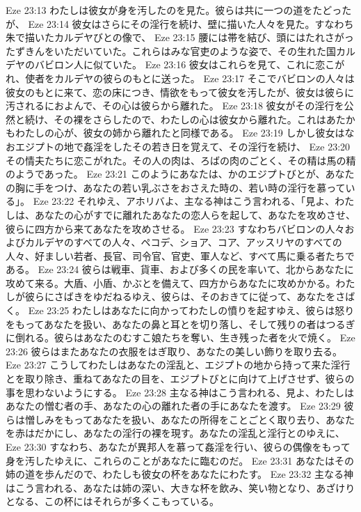 Eze 23:13  わたしは彼女が身を汚したのを見た。彼らは共に一つの道をたどったが、
Eze 23:14  彼女はさらにその淫行を続け、壁に描いた人々を見た。すなわち朱で描いたカルデヤびとの像で、
Eze 23:15  腰には帯を結び、頭にはたれさがったずきんをいただいていた。これらはみな官吏のような姿で、その生れた国カルデヤのバビロン人に似ていた。
Eze 23:16  彼女はこれらを見て、これに恋こがれ、使者をカルデヤの彼らのもとに送った。
Eze 23:17  そこでバビロンの人々は彼女のもとに来て、恋の床につき、情欲をもって彼女を汚したが、彼女は彼らに汚されるにおよんで、その心は彼らから離れた。
Eze 23:18  彼女がその淫行を公然と続け、その裸をさらしたので、わたしの心は彼女から離れた。これはあたかもわたしの心が、彼女の姉から離れたと同様である。
Eze 23:19  しかし彼女はなおエジプトの地で姦淫をしたその若き日を覚えて、その淫行を続け、
Eze 23:20  その情夫たちに恋こがれた。その人の肉は、ろばの肉のごとく、その精は馬の精のようであった。
Eze 23:21  このようにあなたは、かのエジプトびとが、あなたの胸に手をつけ、あなたの若い乳ぶさをおさえた時の、若い時の淫行を慕っている」。
Eze 23:22  それゆえ、アホリバよ、主なる神はこう言われる、「見よ、わたしは、あなたの心がすでに離れたあなたの恋人らを起して、あなたを攻めさせ、彼らに四方から来てあなたを攻めさせる。
Eze 23:23  すなわちバビロンの人々およびカルデヤのすべての人々、ペコデ、ショア、コア、アッスリヤのすべての人々、好ましい若者、長官、司令官、官吏、軍人など、すべて馬に乗る者たちである。
Eze 23:24  彼らは戦車、貨車、および多くの民を率いて、北からあなたに攻めて来る。大盾、小盾、かぶとを備えて、四方からあなたに攻めかかる。わたしが彼らにさばきをゆだねるゆえ、彼らは、そのおきてに従って、あなたをさばく。
Eze 23:25  わたしはあなたに向かってわたしの憤りを起すゆえ、彼らは怒りをもってあなたを扱い、あなたの鼻と耳とを切り落し、そして残りの者はつるぎに倒れる。彼らはあなたのむすこ娘たちを奪い、生き残った者を火で焼く。
Eze 23:26  彼らはまたあなたの衣服をはぎ取り、あなたの美しい飾りを取り去る。
Eze 23:27  こうしてわたしはあなたの淫乱と、エジプトの地から持って来た淫行とを取り除き、重ねてあなたの目を、エジプトびとに向けて上げさせず、彼らの事を思わないようにする。
Eze 23:28  主なる神はこう言われる、見よ、わたしはあなたの憎む者の手、あなたの心の離れた者の手にあなたを渡す。
Eze 23:29  彼らは憎しみをもってあなたを扱い、あなたの所得をことごとく取り去り、あなたを赤はだかにし、あなたの淫行の裸を現す。あなたの淫乱と淫行とのゆえに、
Eze 23:30  すなわち、あなたが異邦人を慕って姦淫を行い、彼らの偶像をもって身を汚したゆえに、これらのことがあなたに臨むのだ。
Eze 23:31  あなたはその姉の道を歩んだので、わたしも彼女の杯をあなたにわたす。
Eze 23:32  主なる神はこう言われる、あなたは姉の深い、大きな杯を飲み、笑い物となり、あざけりとなる、この杯にはそれらが多くこもっている。
